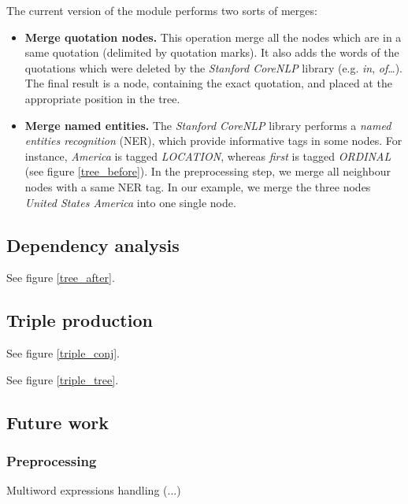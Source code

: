 The current version of the module performs two sorts of merges:
\begin{itemize}
    \item \textbf{Merge quotation nodes.} This operation merge all the nodes which
    are in a same quotation (delimited by quotation marks). It also adds the words
    of the quotations which were deleted by the \emph{Stanford CoreNLP} library
    (e.g. \emph{in}, \emph{of}\dots). The final result is a node, containing the
    exact quotation, and placed at the appropriate position in the tree.
    \item \textbf{Merge named entities.} The \emph{Stanford CoreNLP} library 
    performs a \emph{named entities recognition} (NER), which provide informative 
    tags in some nodes. For instance, \emph{America} is tagged \emph{LOCATION}, 
    whereas \emph{first} is tagged \emph{ORDINAL} (see figure \ref{tree_before}).
    In the preprocessing step, we merge all neighbour nodes with a same NER tag.
    In our example, we merge the three nodes \emph{United States America} into
    one single node.
\end{itemize}

\subsection{Dependency analysis}

See figure \ref{tree_after}.


\subsection{Triple production}

See figure \ref{triple_conj}.

See figure \ref{triple_tree}.


\subsection{Future work}

\subsubsection{Preprocessing}
Multiword expressions handling (...)
